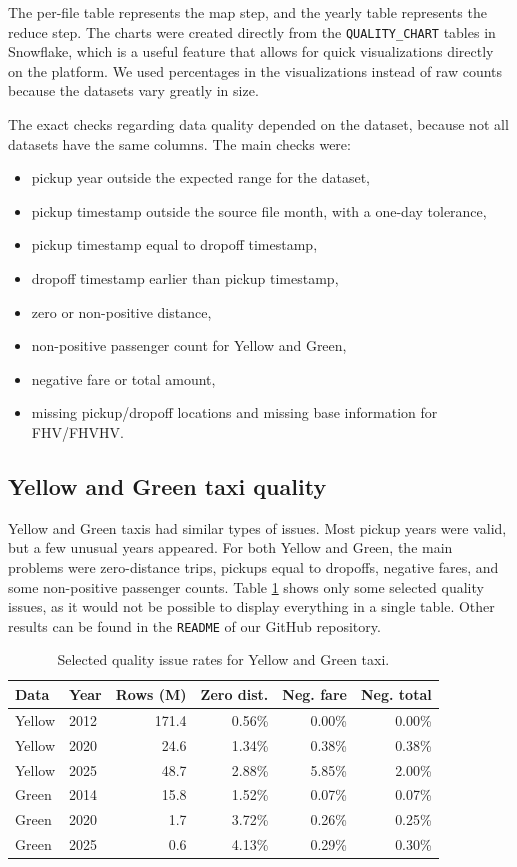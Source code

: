 \documentclass[fleqn,moreauthors,9pt]{ds_report}
\begin{document}
The per-file table represents the map step, and the yearly table represents the reduce step. The charts were created directly from the \texttt{QUALITY\_CHART} tables in Snowflake, which is a useful feature that allows for quick visualizations directly on the platform. We used percentages in the visualizations instead of raw counts because the datasets vary greatly in size.

The exact checks regarding data quality depended on the dataset, because not all datasets have the same columns. The main checks were:
\begin{itemize}[noitemsep,topsep=2pt]
\item pickup year outside the expected range for the dataset,
\item pickup timestamp outside the source file month, with a one-day tolerance,
\item pickup timestamp equal to dropoff timestamp,
\item dropoff timestamp earlier than pickup timestamp,
\item zero or non-positive distance,
\item non-positive passenger count for Yellow and Green,
\item negative fare or total amount,
\item missing pickup/dropoff locations and missing base information for FHV/FHVHV.
\end{itemize}

\subsection*{Yellow and Green taxi quality}

Yellow and Green taxis had similar types of issues. Most pickup years were valid, but a few unusual years appeared. For both Yellow and Green, the main problems were zero-distance trips, pickups equal to dropoffs, negative fares, and some non-positive passenger counts. Table \ref{tab:t2_yellow_green} shows only some selected quality issues, as it would not be possible to display everything in a single table. Other results can be found in the \texttt{README} of our GitHub repository.

\begin{table}[h]
\centering
\caption{Selected quality issue rates for Yellow and Green taxi.}
\label{tab:t2_yellow_green}
\scriptsize
\begin{tabular*}{\columnwidth}{@{\extracolsep{\fill}}llrrrr}
\toprule
Data & Year & Rows (M) & Zero dist. & Neg. fare & Neg. total \\
\midrule
Yellow & 2012 & 171.4 & 0.56\% & 0.00\% & 0.00\% \\
Yellow & 2020 & 24.6  & 1.34\% & 0.38\% & 0.38\% \\
Yellow & 2025 & 48.7  & 2.88\% & 5.85\% & 2.00\% \\
Green  & 2014 & 15.8  & 1.52\% & 0.07\% & 0.07\% \\
Green  & 2020 & 1.7   & 3.72\% & 0.26\% & 0.25\% \\
Green  & 2025 & 0.6   & 4.13\% & 0.29\% & 0.30\% \\
\bottomrule
\end{tabular*}
\end{table}
\end{document}
